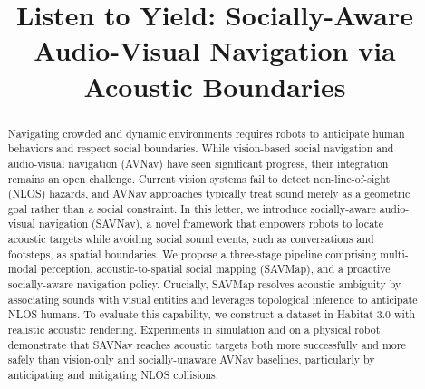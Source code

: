 
\usepackage[bookmarks=true]{hyperref}
\usepackage{booktabs}
\usepackage{multirow}



\title{Listen to Yield: Socially-Aware Audio-Visual Navigation via Acoustic Boundaries}



\maketitle

\begin{abstract}
    Navigating crowded and dynamic environments requires robots to anticipate human behaviors and respect social boundaries. While vision-based social navigation and audio-visual navigation (AVNav) have seen significant progress, their integration remains an open challenge. Current vision systems fail to detect non-line-of-sight (NLOS) hazards, and AVNav approaches typically treat sound merely as a geometric goal rather than a social constraint. In this letter, we introduce socially-aware audio-visual navigation (SAVNav), a novel framework that empowers robots to locate acoustic targets while avoiding social sound events, such as conversations and footsteps, as spatial boundaries. We propose a three-stage pipeline comprising multi-modal perception, acoustic-to-spatial social mapping (SAVMap), and a proactive socially-aware navigation policy. Crucially, SAVMap resolves acoustic ambiguity by associating sounds with visual entities and leverages topological inference to anticipate NLOS humans. To evaluate this capability, we construct a dataset in Habitat 3.0 with realistic acoustic rendering. Experiments in simulation and on a physical robot demonstrate that SAVNav reaches acoustic targets both more successfully and more safely than vision-only and socially-unaware AVNav baselines, particularly by anticipating and mitigating NLOS collisions.
\end{abstract}














